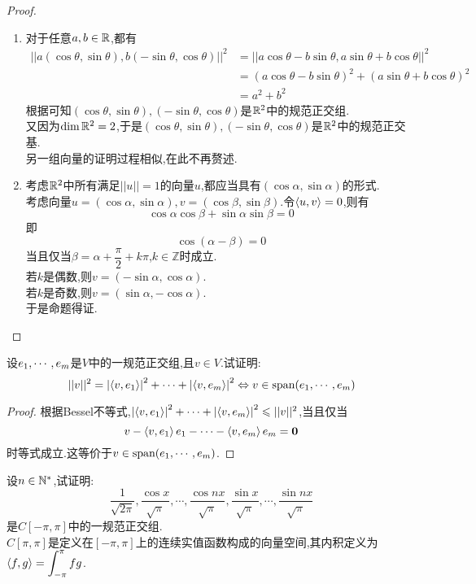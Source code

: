 \documentclass{ctexart}
\begin{document}
\begin{proof}
    \begin{enumerate}[label=\tbf{(\arabic*)}]
        \item 对于任意$a,b\in\mathbb{R}$,都有
            \[\begin{aligned}
                ||a(\cos\theta,\sin\theta),b(-\sin\theta,\cos\theta)||^2
                &= ||a\cos\theta-b\sin\theta,a\sin\theta+b\cos\theta||^2 \\
                &= (a\cos\theta-b\sin\theta)^2+(a\sin\theta+b\cos\theta)^2 \\
                &= a^2+b^2
            \end{aligned}\]
            根据可知$(\cos\theta,\sin\theta),(-\sin\theta,\cos\theta)$是$\mathbb{R}^2$中的规范正交组.\\
            又因为$\dim\mathbb{R}^2=2$,于是$(\cos\theta,\sin\theta),(-\sin\theta,\cos\theta)$是$\mathbb{R}^2$中的规范正交基.\\
            另一组向量的证明过程相似,在此不再赘述.
        \item 考虑$\mathbb{R}^2$中所有满足$||u||=1$的向量$u$,都应当具有$(\cos\alpha,\sin\alpha)$的形式.\\
            考虑向量$u=(\cos\alpha,\sin\alpha),v=(\cos\beta,\sin\beta)$.令$\left\langle{u},{v}\right\rangle=0$,则有
            \[\cos\alpha\cos\beta+\sin\alpha\sin\beta=0\]
            即\[\cos(\alpha-\beta)=0\]
            当且仅当$\beta=\alpha+\dfrac{\pi}{2}+k\pi$,$k\in\mathbb{Z}$时成立.\\
            若$k$是偶数,则$v=(-\sin\alpha,\cos\alpha)$.\\
            若$k$是奇数,则$v=(\sin\alpha,-\cos\alpha)$.\\
            于是命题得证.
    \end{enumerate}
\end{proof}
\begin{problem}[3.]
    设${e}_1,\cdots,{e}_{m}$是$V$中的一规范正交组,且$v\in V$.试证明:
    \[||v||^2=\left|\left\langle{v},{e_1}\right\rangle\right|^2+\cdots+\left|\left\langle{v},{e_m}\right\rangle\right|^2\Leftrightarrow v\in\text{span}({e}_1,\cdots,{e}_{m})\]
\end{problem}
\begin{proof}
    根据Bessel不等式,$\left|\left\langle{v},{e_1}\right\rangle\right|^2+\cdots+\left|\left\langle{v},{e_m}\right\rangle\right|^2\leqslant||v||^2$,当且仅当
    \[v-\left\langle{v},{e_1}\right\rangle e_1-\cdots-\left\langle{v},{e_m}\right\rangle e_m=\mathbf0\]
    时等式成立.这等价于$v\in\text{span}({e}_1,\cdots,{e}_{m})$.
\end{proof}
\begin{problem}[4.]
    设$n\in\mathbb{N}^*$,试证明:
    \[\dfrac{1}{\sqrt{2\pi}},\dfrac{\cos x}{\sqrt{\pi}},\cdots,\dfrac{\cos nx}{\sqrt{\pi}},\dfrac{\sin x}{\sqrt{\pi}},\cdots,\dfrac{\sin nx}{\sqrt{\pi}}\]
    是$C[-\pi,\pi]$中的一规范正交组.\\
    $C[\pi,\pi]$是定义在$[-\pi,\pi]$上的连续实值函数构成的向量空间,其内积定义为$\displaystyle\left\langle{f},{g}\right\rangle=\int_{-\pi}^{\pi}fg$.
\end{problem}
\end{document}
